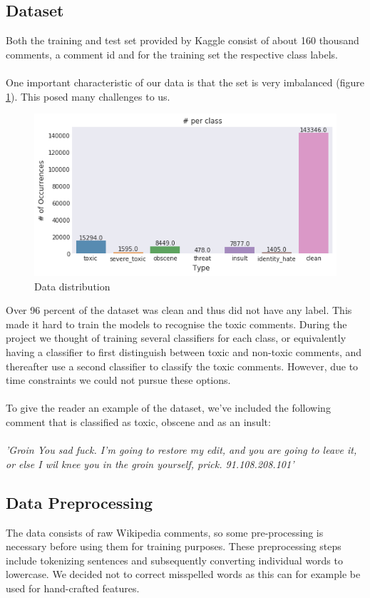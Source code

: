 \documentclass[10pt, a4paper]{article}
\begin{document}
\begin{multicols}{2}
		\section{Dataset}
		Both the training and test set provided by Kaggle consist of about 160 thousand comments, a comment id and for the training set the respective class labels.
		\\
		\\
		One important characteristic of our data is that the set is very imbalanced (figure \ref{fig:data_dist}). This posed many challenges to us.
		\begin{figure}[H]
            \centering
            \includegraphics[scale=.4]{img/distribution_histogram.png}
            \caption{Data distribution}
            \label{fig:data_dist}
        \end{figure}
	    Over 96 percent of the dataset was clean and thus did not have any label. This made it hard to train the models to recognise the toxic comments. During the project we thought of training several classifiers for each class, or equivalently having a classifier to first distinguish between toxic and non-toxic comments, and thereafter use a second classifier to classify the toxic comments. However, due to time constraints we could not pursue these options.
	    \\
	    \\
	    To give the reader an example of the dataset, we've included the following comment that is classified as toxic, obscene and as an insult:
	    \\
	    \\
        \textit{'Groin You sad fuck. I'm going to restore my edit, and you are going to leave it, or else I wil knee you in the groin yourself, prick. 91.108.208.101'}
	
		\subsection*{Data Preprocessing}
		The data consists of raw Wikipedia comments, so some pre-processing is necessary before using them for training purposes. These preprocessing steps include tokenizing sentences and subsequently converting individual words to lowercase. We decided not to correct misspelled words as this can for example be used for hand-crafted features. 
		

\end{multicols}
\end{document}
